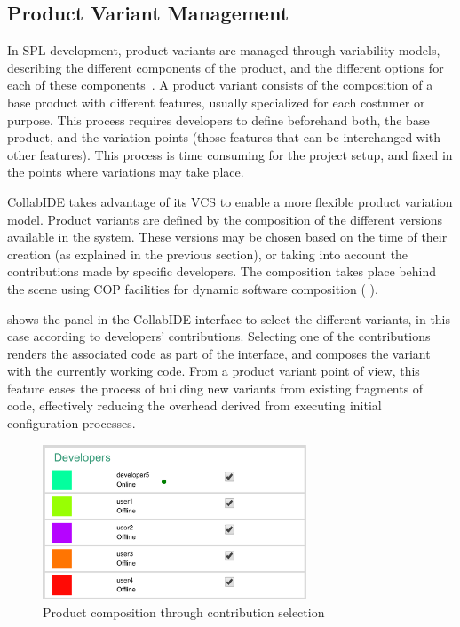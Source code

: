 \subsection{Product Variant Management}
\label{sec:product-variant}
In \ac{SPL} development, product variants are managed through variability models, describing the 
different components of the product, and the different options for each of these 
components~\cite{pohl05}. A product variant consists of the composition of a base product with 
different features, usually specialized for each costumer or purpose. This process requires developers 
to define beforehand both, the base product, and the variation points (\ie those features that can be 
interchanged with other features). This process is time consuming for the project setup, and fixed in 
the points where variations may take place.

CollabIDE takes advantage of its \ac{VCS} to enable a more flexible product variation model. Product 
variants are defined by the composition of the different versions available in the system. These 
versions may be chosen based on the time of their creation (as explained in the previous section), or 
taking into account the contributions made by specific developers. The composition takes place 
behind the scene using \ac{COP} facilities for dynamic software composition (\cf 
{}).

 shows the panel in the CollabIDE interface to select the different variants, in this 
case according to developers' contributions. Selecting one of the contributions renders the associated 
code as part of the interface, and composes the variant with the currently working code. From a 
product variant point of view, this feature eases the process of building new variants from existing 
fragments of code, effectively reducing the overhead derived from executing initial configuration 
processes.

\begin{figure}[htbp]
  \centering
  \includegraphics[width=0.7\textwidth]{img/fig3-collabIDEContributionManagement}
  \caption{Product composition through contribution selection}
  \label{fig:contribution}
\end{figure}


